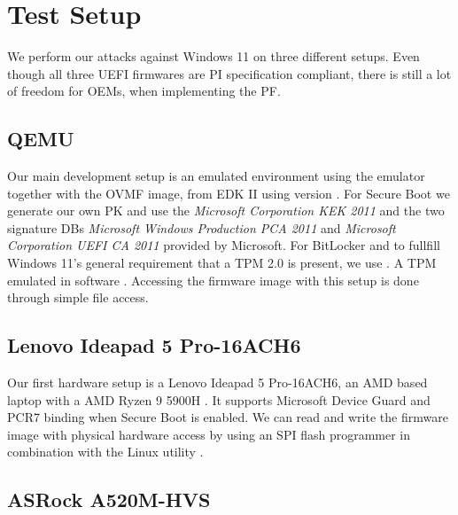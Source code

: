 
\chapter{Test Setup}
\label{sec:test-setup}

We perform our attacks against Windows 11 on three different setups.
Even though all three \ac{UEFI} firmwares are \ac{PI} specification compliant, there is still a lot of freedom for \acp{OEM}, when implementing the \ac{PF}.

\section{\acs{QEMU}}
\label{sec:test-setup:qemu}

Our main development setup is an emulated environment using the emulator  \cite{qemu} together with the \ac{OVMF} image, from \ac{EDK} II using version .
For Secure Boot we generate our own \ac{PK} and use the \emph{Microsoft Corporation \acs{KEK}  2011} and the two signature \acp{DB} \emph{Microsoft Windows Production PCA 2011} and \emph{Microsoft Corporation UEFI CA 2011} provided by Microsoft.
For BitLocker and to fullfill Windows 11's general requirement that a \ac{TPM} 2.0 is present, we use .
A \ac{TPM} emulated in software \cite{swtpm}.
Accessing the firmware image with this setup is done through simple file access.

\section{Lenovo Ideapad 5 Pro-16ACH6}
\label{sec:test-setup:lenovo}

Our first hardware setup is a Lenovo Ideapad 5 Pro-16ACH6, an \ac{AMD} based laptop with a \ac{AMD} Ryzen 9 5900H \cite{lenovo-ideapad}.
It supports Microsoft Device Guard and \ac{PCR}7 binding when Secure Boot is enabled.
We can read and write the firmware image with physical hardware access by using an \ac{SPI} flash programmer in combination with the Linux utility .

\section{ASRock A520M-HVS}
\label{sec:test-setup:asrock}

